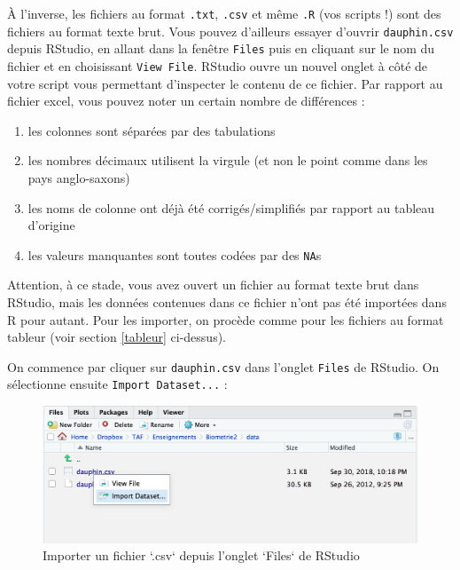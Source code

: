 \documentclass[a4paperpaper,]{article}
\providecommand{\tightlist}{%
  \setlength{\itemsep}{0pt}\setlength{\parskip}{0pt}}
\begin{document}
À l'inverse, les fichiers au format \texttt{.txt}, \texttt{.csv} et même \texttt{.R} (vos scripts !) sont des fichiers au format texte brut. Vous pouvez d'ailleurs essayer d'ouvrir \texttt{dauphin.csv} depuis RStudio, en allant dans la fenêtre \texttt{Files} puis en cliquant sur le nom du fichier et en choisissant \texttt{View\ File}. RStudio ouvre un nouvel onglet à côté de votre script vous permettant d'inspecter le contenu de ce fichier. Par rapport au fichier excel, vous pouvez noter un certain nombre de différences :

\begin{enumerate}
\def\labelenumi{\arabic{enumi}.}
\tightlist
\item
  les colonnes sont séparées par des tabulations
\item
  les nombres décimaux utilisent la virgule (et non le point comme dans les pays anglo-saxons)
\item
  les noms de colonne ont déjà été corrigés/simplifiés par rapport au tableau d'origine
\item
  les valeurs manquantes sont toutes codées par des \texttt{NA}s
\end{enumerate}

Attention, à ce stade, vous avez ouvert un fichier au format texte brut dans RStudio, mais les données contenues dans ce fichier n'ont pas été importées dans R pour autant. Pour les importer, on procède comme pour les fichiers au format tableur (voir section \ref{tableur} ci-dessus).

On commence par cliquer sur \texttt{dauphin.csv} dans l'onglet \texttt{Files} de RStudio. On sélectionne ensuite \texttt{Import\ Dataset...} :

\begin{figure}[htpb]

{\centering \includegraphics[width=0.8\linewidth]{images/importcsv1} 

}

\caption{Importer un fichier `.csv` depuis l'onglet `Files` de RStudio}\label{fig:importcsv1}
\end{figure}
\end{document}
